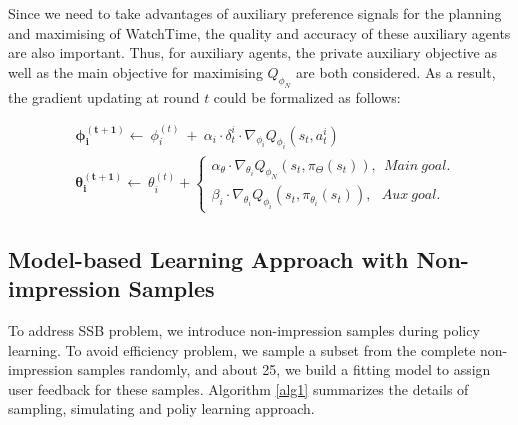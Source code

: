 Since we need to take advantages of auxiliary preference signals for the planning and maximising of WatchTime, the quality and accuracy of these auxiliary agents are also important. Thus, for auxiliary agents, the private auxiliary objective as well as the main objective for maximising $Q_{\phi_N}$ are both considered. As a result, the gradient updating at round $t$ could be formalized as follows:
\begin{small}
\begin{equation} \label{eq3}
\begin{aligned}
& \bm{\phi_i^{(t+1)}} \leftarrow \  \phi_i^{(t)} \ + \ \alpha_{i} \cdot \delta_t^i \cdot \nabla_{\phi_i}Q_{\phi_i}(s_t,a_t^i) \\
& \bm{\theta_i^{(t+1)}} \leftarrow \ \theta_i^{(t)} + 
\begin{cases}
\alpha_{\theta} \cdot \nabla_{\theta_i}Q_{\phi_N}(s_t,\pi_{\Theta}(s_t)), \ \ Main \ goal. \\ 
\beta_i \cdot \nabla_{\theta_i}Q_{\phi_i}(s_t,\pi_{\theta_i}(s_t)), \ \ \ Aux \ goal.
\end{cases}
\end{aligned}
\end{equation}
\end{small}





\subsection{Model-based Learning Approach with Non-impression Samples}
To address SSB problem, we introduce non-impression samples during policy learning. 
To avoid efficiency problem, we sample a subset from the complete non-impression samples randomly, and about 25\Moreover, we build a fitting model to assign user feedback for these samples.
Algorithm \ref{alg1} summarizes the details of sampling, simulating and poliy learning approach.

